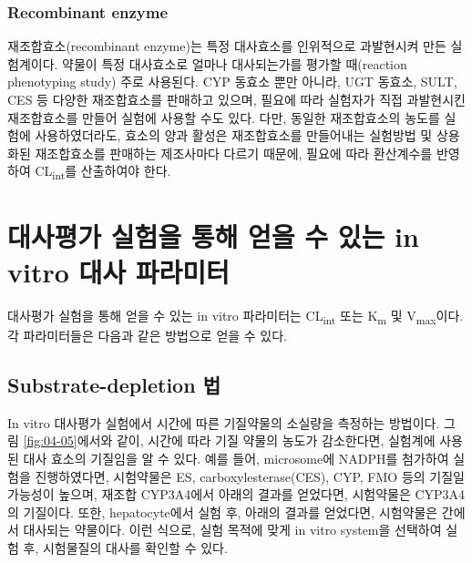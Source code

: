 \documentclass[
  11pt,
  krantz2, a4paper, twoside]{krantz}
\begin{document}
\hypertarget{recombinant-enzyme}{%
\subsubsection{Recombinant enzyme}\label{recombinant-enzyme}}

재조합효소(recombinant enzyme)는 특정 대사효소를 인위적으로 과발현시켜
만든 실험계이다. 약물이 특정 대사효소로 얼마나 대사되는가를 평가할
때(reaction phenotyping study) 주로 사용된다. CYP 동효소 뿐만 아니라,
UGT 동효소, SULT, CES 등 다양한 재조합효소를 판매하고 있으며, 필요에
따라 실험자가 직접 과발현시킨 재조합효소를 만들어 실험에 사용할 수도
있다. 다만, 동일한 재조합효소의 농도를 실험에 사용하였더라도, 효소의
양과 활성은 재조합효소를 만들어내는 실험방법 및 상용화된 재조합효소를
판매하는 제조사마다 다르기 때문에, 필요에 따라 환산계수를 반영하여
CL\textsubscript{int}를 산출하여야 한다.

\hypertarget{uxb300uxc0acuxd3c9uxac00-uxc2e4uxd5d8uxc744-uxd1b5uxd574-uxc5bbuxc744-uxc218-uxc788uxb294-in-vitro-uxb300uxc0ac-uxd30cuxb77cuxbbf8uxd130}{%
\section{대사평가 실험을 통해 얻을 수 있는 in vitro 대사 파라미터}\label{uxb300uxc0acuxd3c9uxac00-uxc2e4uxd5d8uxc744-uxd1b5uxd574-uxc5bbuxc744-uxc218-uxc788uxb294-in-vitro-uxb300uxc0ac-uxd30cuxb77cuxbbf8uxd130}}

대사평가 실험을 통해 얻을 수 있는 in vitro 파라미터는 CL\textsubscript{int} 또는 K\textsubscript{m}
및 V\textsubscript{max}이다. 각 파라미터들은 다음과 같은 방법으로 얻을 수 있다.

\hypertarget{substrate-depletion-uxbc95}{%
\subsection{Substrate-depletion 법}\label{substrate-depletion-uxbc95}}

In vitro 대사평가 실험에서 시간에 따른 기질약물의 소실량을 측정하는
방법이다. 그림 \ref{fig:04-05}에서와 같이, 시간에 따라 기질 약물의 농도가
감소한다면, 실험계에 사용된 대사 효소의 기질임을 알 수 있다. 예를 들어,
microsome에 NADPH를 첨가하여 실험을 진행하였다면, 시험약물은 ES,
carboxylesterase(CES), CYP, FMO 등의 기질일 가능성이 높으며, 재조합
CYP3A4에서 아래의 결과를 얻었다면, 시험약물은 CYP3A4의 기질이다. 또한,
hepatocyte에서 실험 후, 아래의 결과를 얻었다면, 시험약물은 간에서
대사되는 약물이다. 이런 식으로, 실험 목적에 맞게 in vitro system을
선택하여 실험 후, 시험물질의 대사를 확인할 수 있다.
\end{document}
